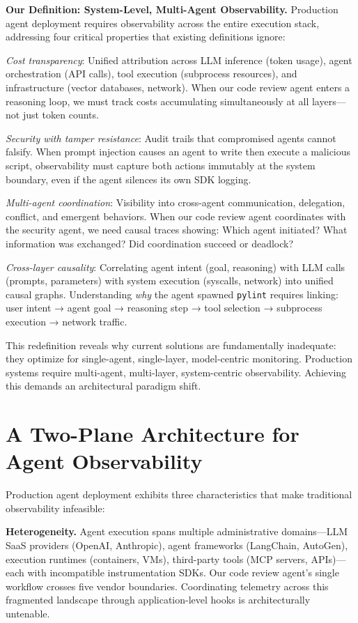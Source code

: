 \documentclass[sigplan,screen,9pt]{acmart}
\begin{document}
\textbf{Our Definition: System-Level, Multi-Agent Observability.} Production agent deployment requires observability across the entire execution stack, addressing four critical properties that existing definitions ignore:

\emph{Cost transparency}: Unified attribution across LLM inference (token usage), agent orchestration (API calls), tool execution (subprocess resources), and infrastructure (vector databases, network). When our code review agent enters a reasoning loop, we must track costs accumulating simultaneously at all layers—not just token counts.

\emph{Security with tamper resistance}: Audit trails that compromised agents cannot falsify. When prompt injection causes an agent to write then execute a malicious script, observability must capture both actions immutably at the system boundary, even if the agent silences its own SDK logging.

\emph{Multi-agent coordination}: Visibility into cross-agent communication, delegation, conflict, and emergent behaviors. When our code review agent coordinates with the security agent, we need causal traces showing: Which agent initiated? What information was exchanged? Did coordination succeed or deadlock?

\emph{Cross-layer causality}: Correlating agent intent (goal, reasoning) with LLM calls (prompts, parameters) with system execution (syscalls, network) into unified causal graphs. Understanding \emph{why} the agent spawned \texttt{pylint} requires linking: user intent → agent goal → reasoning step → tool selection → subprocess execution → network traffic.

This redefinition reveals why current solutions are fundamentally inadequate: they optimize for single-agent, single-layer, model-centric monitoring. Production systems require multi-agent, multi-layer, system-centric observability. Achieving this demands an architectural paradigm shift.

\section{A Two-Plane Architecture for Agent Observability}

Production agent deployment exhibits three characteristics that make traditional observability infeasible:

\textbf{Heterogeneity.} Agent execution spans multiple administrative domains—LLM SaaS providers (OpenAI, Anthropic), agent frameworks (LangChain, AutoGen), execution runtimes (containers, VMs), third-party tools (MCP servers, APIs)—each with incompatible instrumentation SDKs. Our code review agent's single workflow crosses five vendor boundaries. Coordinating telemetry across this fragmented landscape through application-level hooks is architecturally untenable.
\end{document}
